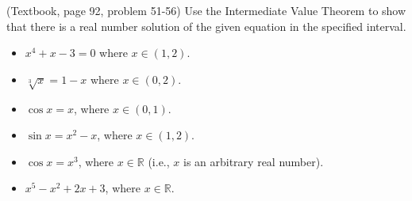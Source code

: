 \begin{problem}
(Textbook, page 92, problem 51-56) Use the Intermediate Value Theorem to show that there is a real number solution of the given equation in the specified interval. 
\begin{multicols}{2}
\begin{itemize}
\item $x^4+x-3=0$ where $x\in (1,2)$.
\item $\sqrt[3]{x}=1-x$ where $x\in (0,2) $.
\item $\cos x=x$, where $x\in (0,1)$.
\item $\sin x=x^2-x$, where $x\in (1,2)$.
\item $\cos x=x^3$, where $x\in \mathbb R$ (i.e., $x$ is an arbitrary real number).
\item $x^5-x^2+2x+3$, where $x\in \mathbb R$.
\end{itemize}
\end{multicols}
\end{problem}